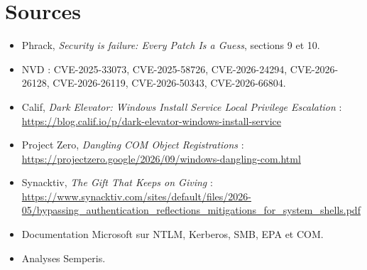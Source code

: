 \documentclass{training}
\begin{document}
\chapter{Sources}
\begin{itemize}
  \item Phrack, \emph{Security is failure: Every Patch Is a Guess},
        sections 9 et 10.
  \item NVD : CVE-2025-33073, CVE-2025-58726, CVE-2026-24294,
        CVE-2026-26128, CVE-2026-26119, CVE-2026-50343,
        CVE-2026-66804.
  \item Calif, \emph{Dark Elevator: Windows Install Service Local Privilege
        Escalation} :
        \url{https://blog.calif.io/p/dark-elevator-windows-install-service}
  \item Project Zero, \emph{Dangling COM Object Registrations} :
        \url{https://projectzero.google/2026/09/windows-dangling-com.html}
  \item Synacktiv, \emph{The Gift That Keeps on Giving} :
        \url{https://www.synacktiv.com/sites/default/files/2026-05/bypassing_authentication_reflections_mitigations_for_system_shells.pdf}
  \item Documentation Microsoft sur NTLM, Kerberos, SMB, EPA et COM.
  \item Analyses Semperis.
\end{itemize}

\end{document}
